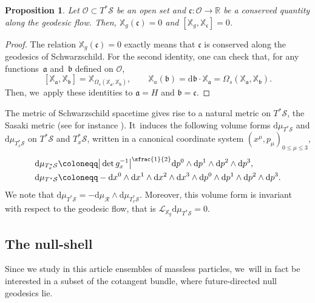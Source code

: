 \documentclass[JEP,XML,SOM,Unicode,published]{cedram}
\theoremstyle{plain}
\newtheorem{proposition}{Proposition}[section]
\theoremstyle{definition}
\newcommand\R{{\mathbb{R}}}
\newcommand\T{{\mathbb{X}}}
\newcommand\dr{{\mathrm{d}}}
\begin{document}
\begin{proposition}
Let $\mathcal{O} \subset T^* \mathcal{S}$ be an open set and $\mathfrak{c} : \mathcal{O} \to \R$ be a conserved quantity along the geodesic flow. Then, $\T_g (\mathfrak{c})=0$ and $[\T_g, \T_{\mathfrak{c}}]=0$.
\end{proposition}
\begin{proof}
The relation $\T_g (\mathfrak{c})=0$ exactly means that $\mathfrak{c}$ is conserved along the geodesics of Schwarzschild. For the second identity, one can check that, for any functions~$\mathfrak{a}$ and~$\mathfrak{b}$ defined on $\mathcal{O}$,
\[
[\T_{\mathfrak{a}}, \T_{\mathfrak{b}}]= \T_{\Omega_s(\T_{\mathfrak{a}},\T_{\mathfrak{b}})},\qquad \T_a (\mathfrak{b})=\dr \mathfrak{b} \cdot \T_{\mathfrak{a}} = \Omega_s(\T_{\mathfrak{a}},\T_{\mathfrak{b}}).
\]
Then, we~apply these identities to $\mathfrak{a}=H$ and $\mathfrak{b}=\mathfrak{c}$.
\end{proof}

The metric of Schwarzschild spacetime gives rise to a natural metric on $T^* \mathcal{S}$, the Sasaki metric (see for instance \cite[\S II.D]{AGS}). It~induces the following volume forms $\dr \mu_{T^* \mathcal{S}}$ and $\dr \mu_{T^*_x \mathcal{S}}$ on $T^* \mathcal{S}$ and $T^*_x \mathcal{S}$, written in a canonical coordinate system $(x^\mu,p_\mu)_{0 \leq \mu \leq 3}$,
\begin{align*}
\dr \mu_{T^*_x \mathcal{S}} & \coloneqq \big|\det g^{-1}_x \big|^{\sfrac{1}{2}} \dr p^0 \wedge \dr p^1 \wedge \dr p^2 \wedge \dr p^3, \\
\dr \mu_{T^* \mathcal{S}}& \coloneqq - \dr x^0 \wedge \dr x^1 \wedge \dr x^2 \wedge \dr x^3 \wedge \dr p^0 \wedge \dr p^1 \wedge \dr p^2 \wedge \dr p^3.
\end{align*}
We note that $\dr \mu_{T^* \mathcal{S}}= - \dr \mu_{\mathcal{R}} \wedge \dr \mu_{T^*_x \mathcal{S}}$. Moreover, this volume form is invariant with respect to the geodesic flow, that is $\mathcal{L}_{\T_g}\dr \mu_{T^* \mathcal{S}}=0$.

\subsection{The null-shell}\label{Subsecnullshell}

Since we study in this article ensembles of massless particles, we~will in fact be interested in a subset of the cotangent bundle, where future-directed null geodesics lie.
\end{document}
